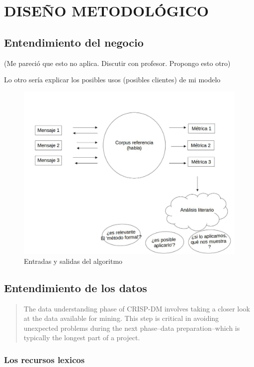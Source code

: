 \documentclass[twoside]{article}
\begin{document}
\section{DISEÑO METODOLÓGICO}
\label{sec:orgf7fd8d7}
\subsection{Entendimiento del negocio}
\label{sec:orgb1f55bf}
(Me pareció que esto no aplica. Discutir con profesor. Propongo esto otro)

Lo otro sería explicar los posibles usos (posibles clientes) de mi modelo
\begin{figure}[htbp]
\centering
\includegraphics[width=.9\linewidth]{./assets/posibles_usos.jpg}
\caption{Entradas y salidas del algoritmo}
\end{figure}

\subsection{Entendimiento de los datos}
\label{sec:org799bd64}

\begin{quote}
The data understanding phase of CRISP-DM involves taking a closer
look at the data available for mining. This step is critical in
avoiding unexpected problems during the next phase--data
preparation--which is typically the longest part of a project.
\end{quote}

\subsubsection{Los recursos lexicos}
\label{sec:org4a36438}
\end{document}
